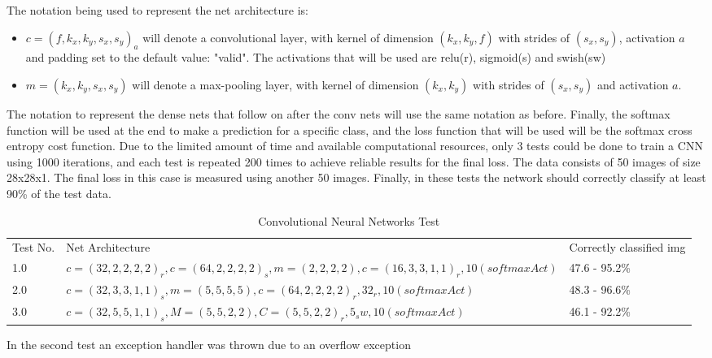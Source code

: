 The notation being used to represent the net architecture is:
\begin{itemize}
    \item $c=(f, k_x, k_y, s_x, s_y)_a$ will denote a convolutional layer, with kernel of dimension $(k_x, k_y, f)$ with strides of $(s_x, s_y)$, activation $a$ and padding set to the default value: "valid".
    The activations that will be used are relu(r), sigmoid(s) and swish(sw)
    \item $m=(k_x, k_y, s_x, s_y)$ will denote a max-pooling layer, with kernel of dimension $(k_x, k_y)$ with strides of $(s_x, s_y)$ and activation $a$.
\end{itemize}
The notation to represent the dense nets that follow on after the conv nets will use the same notation as before. Finally, the softmax function will be used at the end to make a prediction for a specific class, and the loss function that will be used will be the softmax cross entropy cost function.
Due to the limited amount of time and available computational resources, only 3 tests could be done to train a CNN using 1000 iterations, and each test is repeated 200 times to achieve reliable results for the final loss. The data consists of 50 images of size 28x28x1. The final loss in this case is measured using another 50 images. Finally, in these tests the network should correctly classify at least 90\% of the test data.
\begin{table}[H]
\centering
    \begin{tabular}{|p{1cm}|p{10cm}|p{4cm}|}
        \hline
        Test No. & Net Architecture & Correctly classified img \\ \cline{1-3} 
        1.0 & $c=(32, 2, 2, 2, 2)_r, c = (64, 2, 2, 2, 2)_s, m = (2, 2, 2, 2), c = (16, 3, 3, 1, 1)_r, 10(softmaxAct)$ & 47.6 - 95.2\%  \\ \cline{1-3}
        
        2.0 & $c = (32, 3, 3, 1, 1)_s, m = (5, 5, 5, 5), c = (64, 2, 2, 2, 2)_r, 32_r, 10(softmaxAct)$  & 48.3 - 96.6\% \\ \cline{1-3}
        
        3.0 & $c = (32, 5, 5, 1, 1)_s, M = (5, 5, 2, 2),
        C = (5, 5, 2, 2)_r, 5_sw, 10(softmaxAct)$ & 46.1 - 92.2\% 
        \\ \cline{1-3}
    \end{tabular}
    \caption{Convolutional Neural Networks Test}
\end{table}

In the second test an exception handler was thrown due to an overflow exception

